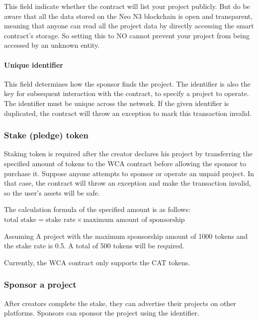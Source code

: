 \documentclass[12pt,a4paper]{article}
\begin{document}
    This field indicate whether the contract will list your project publicly.
    But do be aware that all the data stored on the Neo N3 blockchain is open
    and transparent, meaning that anyone can read all the project data by directly
    accessing the smart contract's storage.
    So setting this to NO cannot prevent your project from being accessed by an
    unknown entity.

    \paragraph{Unique identifier}

    This field determines how the sponsor finds the project.
    The identifier is also the key for subsequent interaction with the contract,
    to specify a project to operate.
    The identifier must be unique across the network.
    If the given identifier is duplicated, the contract will throw an exception
    to mark this transaction invalid.

    \subsubsection{Stake (pledge) token}

    Staking token is required after the creator declares his project by transferring
    the specified amount of tokens to the WCA contract before allowing the sponsor
    to purchase it.
    Suppose anyone attempts to sponsor or operate an unpaid project.
    In that case, the contract will throw an exception and make the transaction
    invalid, so the user's assets will be safe.

    The calculation formula of the specified amount is as follows:
    $\text{total stake} = \text{stake rate} \times \text{maximum amount of sponsorship}$

    Assuming A project with the maximum sponsorship amount of 1000 tokens and
    the stake rate is 0.5. A total of 500 tokens will be required.

    Currently, the WCA contract only supports the CAT tokens.

    \subsubsection{Sponsor a project}

    After creators complete the stake, they can advertise their projects on other
    platforms.
    Sponsors can sponsor the project using the identifier.
\end{document}
